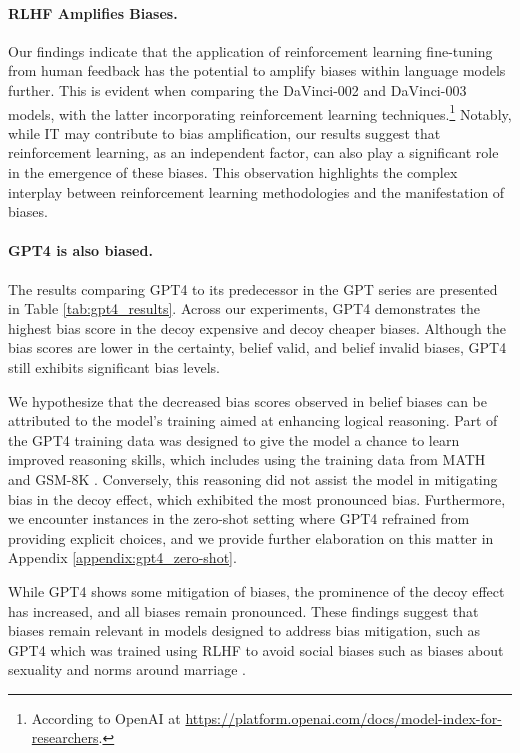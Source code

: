 \paragraph{RLHF Amplifies Biases.}

Our findings indicate that the application of reinforcement learning fine-tuning from human feedback has the potential to amplify biases within language models further.
This is evident when comparing the DaVinci-002 and DaVinci-003 models, with the latter incorporating reinforcement learning techniques.\footnote{According to OpenAI at \url{https://platform.openai.com/docs/model-index-for-researchers}.}
Notably, while IT may contribute to bias amplification, our results suggest that reinforcement learning, as an independent factor, can also play a significant role in the emergence of these biases.
This observation highlights the complex interplay between reinforcement learning methodologies and the manifestation of biases.






\paragraph{GPT4 is also biased.}
The results comparing GPT4 to its predecessor in the GPT series are presented in Table \ref{tab:gpt4_results}.
Across our experiments, GPT4 demonstrates the highest bias score in the decoy expensive and decoy cheaper biases.
Although the bias scores are lower in the certainty, belief valid, and belief invalid biases, GPT4 still exhibits significant bias levels.

We hypothesize that the decreased bias scores observed in belief biases can be attributed to the model's training aimed at enhancing logical reasoning.
Part of the GPT4 training data was designed to give the model a chance to learn improved reasoning skills, which includes using the training data from MATH \cite{hendrycks2021measuring} and GSM-8K \cite{cobbe2021training}.
Conversely, this reasoning did not assist the model in mitigating bias in the decoy effect, which exhibited the most pronounced bias.
Furthermore, we encounter instances in the zero-shot setting where GPT4 refrained from providing explicit choices, and we provide further elaboration on this matter in Appendix \ref{appendix:gpt4_zero-shot}.

While GPT4 shows some mitigation of biases, the prominence of the decoy effect has increased, and all biases remain pronounced.
These findings suggest that biases remain relevant in models designed to address bias mitigation, such as GPT4 which was trained using RLHF to avoid social biases such as biases about sexuality and norms around marriage \cite{2303.08774}.


